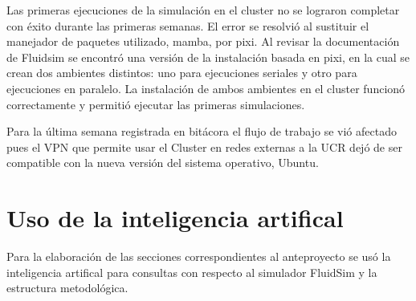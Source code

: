 Las primeras ejecuciones de la simulación en el cluster no 
se lograron completar con éxito durante las primeras semanas. 
El error se resolvió al sustituir el manejador de paquetes utilizado,
mamba, por pixi. Al revisar la documentación de Fluidsim se encontró 
una versión de la instalación basada en pixi, en la cual se crean 
dos ambientes distintos: uno para ejecuciones seriales y otro para 
ejecuciones en paralelo. La instalación de ambos ambientes en el 
cluster funcionó correctamente y permitió ejecutar las primeras simulaciones.

Para la última semana registrada en bitácora el flujo de trabajo se vió afectado
pues el VPN que permite usar el Cluster en redes externas a la UCR dejó de ser compatible
con la nueva versión del sistema operativo, Ubuntu. 

\section{Uso de la inteligencia artifical}

Para la elaboración de las secciones correspondientes al anteproyecto se usó la inteligencia artifical
para consultas con respecto al simulador FluidSim y la estructura metodológica.






\clearpage
\appendix



